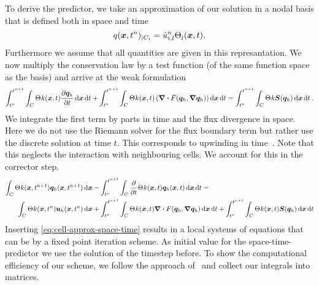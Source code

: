 To derive the predictor, we take an approximation of our solution in a nodal basis that is defined both in space and time
\begin{equation}
  \label{eq:cell-approx-space-time}
  q(\bm{x}, t^n)_{|\cell[i]} = \hat{u}^n_{i,l} \stbasis[][l](\bm{x}, t).
\end{equation}
Furthermore we assume that all quantities are given in this represantation.
We now multiply the conservation law by a test function (of the same function space as the basis) and arrive at the weak formulation
\begin{equation}\label{eq:weak-pde-space-time}
\intdt{\intdcell{
    \sttestfunction{k}(\bm{x}, t)
    \pdv{\stpredictor}{t}
}}
+
\intdt{\intdcell{
    \sttestfunction{k}(\bm{x}, t)
    \left(
      \divergence{\flux(\stpredictor, \gradient{\stpredictor})}
    \right)
}}
=
\intdt{\intdcell{
  \sttestfunction{k} \source(\stpredictor)
}}.
\end{equation}
We integrate the first term by parts in time and the flux divergence in space.
Here we do not use the Riemann solver for the flux boundary term but rather use the discrete solution at time $t$.
This corresponds to upwinding in time~\cite{dumbser2008unified}.
Note that this neglects the interaction with neighbouring cells.
We account for this in the corrector step.
\begin{align}\label{eq:space-time-predictor}
\begin{split}
\intdcell{
  \sttestfunction{k} (\bm{x}, t^{n+1}) \stpredictor(\bm{x}, t^{n+1})
}
&-
\intdt{\intdcell{
    \pdv{}{t} \sttestfunction{k}(\bm{x}, t) \stpredictor(\bm{x}, t)
}}
= \\
\intdcell{
  \sttestfunction{k}(\bm{x},t^n) \dsol(\bm{x}, t^n)
}
&+
\intdt{\intdcell{
    \sttestfunction{k}(\bm{x},t) \divergence{\flux(\stpredictor, \gradient{\stpredictor})}
}}
+
\intdt{\intdcell{
    \sttestfunction{k}(\bm{x}, t) \source(\stpredictor)
}}
\end{split}
\end{align}
Inserting \cref{eq:cell-approx-space-time} results in a local systems of equations that can be by a fixed point iteration scheme.
As initial value for the space-time-predictor we use the solution of the timestep before.
To show the computational efficiency of our scheme, we follow the approach of~\cite{dumbser2008unified} and collect our integrals into matrices.

